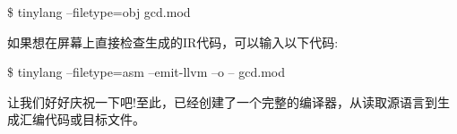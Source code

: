 \begin{tcolorbox}[colback=white,colframe=black]
\$ tinylang –filetype=obj gcd.mod
\end{tcolorbox}

如果想在屏幕上直接检查生成的IR代码，可以输入以下代码:\par

\begin{tcolorbox}[colback=white,colframe=black]
\$ tinylang –filetype=asm –emit-llvm –o – gcd.mod
\end{tcolorbox}

让我们好好庆祝一下吧!至此，已经创建了一个完整的编译器，从读取源语言到生成汇编代码或目标文件。\par




